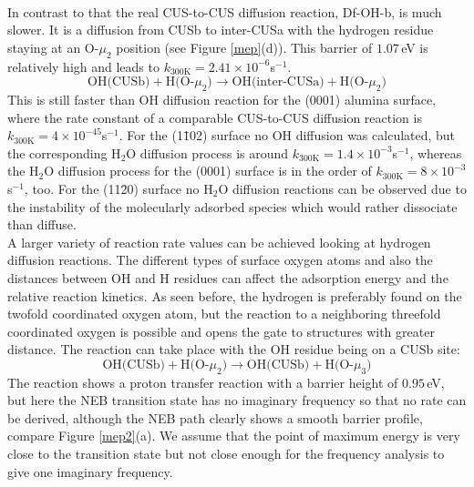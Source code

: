 \documentclass[11pt,DIV=13,BCOR=5mm,a4paper,headinclude]{scrbook}
\begin{document}
\\
In contrast to that the real CUS-to-CUS diffusion reaction, Df-OH-b, is much slower.
It is a diffusion from CUSb to inter-CUSa with the hydrogen residue staying at an O-$\mu_2$ position (see Figure \ref{mep}(d)).
This barrier of $1.07\,$eV is relatively high and leads to $k_{\text{300K}}=2.41\times 10^{-6}$s$^{-1}$.
\begin{equation}
 \text{OH(CUSb)} + \text{H(O-$\mu_2$)} \rightarrow \text{OH(inter-CUSa)} + \text{H(O-$\mu_2$)} \tag{Df-OH-b}
     \label{diffOHb}
\end{equation}
This is still faster than OH diffusion reaction for the (0001) alumina surface\cite{WirthJPCC2012,Wirth2014thesis}, where the rate constant of a comparable CUS-to-CUS diffusion reaction is $k_{\text{300K}}=4\times 10^{-45}$s$^{-1}$.
For the (1\=102) surface no OH diffusion was calculated, but the corresponding H$_2$O diffusion process is around $k_{\text{300K}}=1.4\times 10^{-3}$s$^{-1}$, whereas the H$_2$O diffusion process for the (0001) surface is in the order of $k_{\text{300K}}=8\times 10^{-3}$s$^{-1}$, too.
For the (11\=20) surface no H$_2$O diffusion reactions can be observed due to the instability of the molecularly adsorbed species which would rather dissociate than diffuse.
\\
A larger variety of reaction rate values can be achieved looking at hydrogen diffusion reactions.
The different types of surface oxygen atoms and also the distances between OH and H residues can affect the adsorption energy and the relative reaction kinetics.
As seen before, the hydrogen is preferably found on the twofold coordinated oxygen atom, but the reaction to a neighboring threefold coordinated oxygen is possible and opens the gate to structures with greater distance.
The reaction can take place with the OH residue being on a CUSb site:
\begin{equation}
 \text{OH(CUSb)} + \text{H(O-$\mu_2$)} \rightarrow \text{OH(CUSb)} + \text{H(O-$\mu_3$)} \tag{Df-H-a}
     \label{diffHa}
\end{equation}
The reaction shows a proton transfer reaction with a barrier height of $0.95\,$eV, but here the NEB transition state has no imaginary frequency so that no rate can be derived, although the NEB path clearly shows a smooth barrier profile, compare Figure \ref{mep2}(a).
We assume that the point of maximum energy is very close to the transition state but not close enough for the frequency analysis to give one imaginary frequency.
\end{document}
